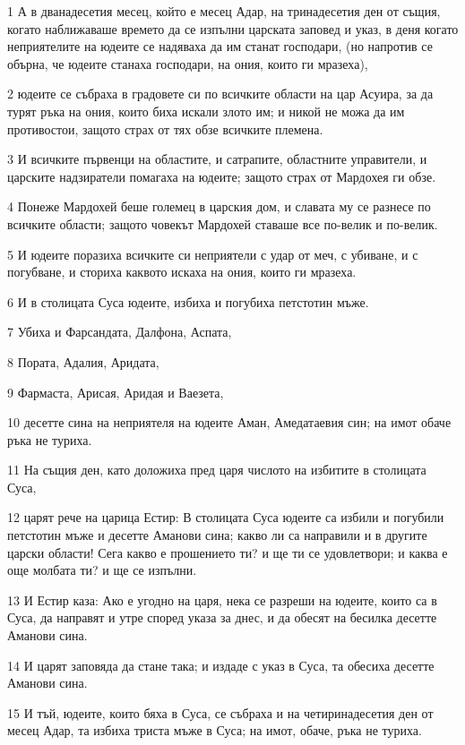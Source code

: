 \par 1 А в дванадесетия месец, който е месец Адар, на тринадесетия ден от същия, когато наближаваше времето да се изпълни царската заповед и указ, в деня когато неприятелите на юдеите се надяваха да им станат господари, (но напротив се обърна, че юдеите станаха господари, на ония, които ги мразеха),
\par 2 юдеите се събраха в градовете си по всичките области на цар Асуира, за да турят ръка на ония, които биха искали злото им; и никой не можа да им противостои, защото страх от тях обзе всичките племена.
\par 3 И всичките първенци на областите, и сатрапите, областните управители, и царските надзиратели помагаха на юдеите; защото страх от Мардохея ги обзе.
\par 4 Понеже Мардохей беше големец в царския дом, и славата му се разнесе по всичките области; защото човекът Мардохей ставаше все по-велик и по-велик.
\par 5 И юдеите поразиха всичките си неприятели с удар от меч, с убиване, и с погубване, и сториха каквото искаха на ония, които ги мразеха.
\par 6 И в столицата Суса юдеите, избиха и погубиха петстотин мъже.
\par 7 Убиха и Фарсандата, Далфона, Аспата,
\par 8 Пората, Адалия, Аридата,
\par 9 Фармаста, Арисая, Аридая и Ваезета,
\par 10 десетте сина на неприятеля на юдеите Аман, Амедатаевия син; на имот обаче ръка не туриха.
\par 11 На същия ден, като доложиха пред царя числото на избитите в столицата Суса,
\par 12 царят рече на царица Естир: В столицата Суса юдеите са избили и погубили петстотин мъже и десетте Аманови сина; какво ли са направили и в другите царски области! Сега какво е прошението ти? и ще ти се удовлетвори; и каква е още молбата ти? и ще се изпълни.
\par 13 И Естир каза: Ако е угодно на царя, нека се разреши на юдеите, които са в Суса, да направят и утре според указа за днес, и да обесят на бесилка десетте Аманови сина.
\par 14 И царят заповяда да стане така; и издаде с указ в Суса, та обесиха десетте Аманови сина.
\par 15 И тъй, юдеите, които бяха в Суса, се събраха и на четиринадесетия ден от месец Адар, та избиха триста мъже в Суса; на имот, обаче, ръка не туриха.
